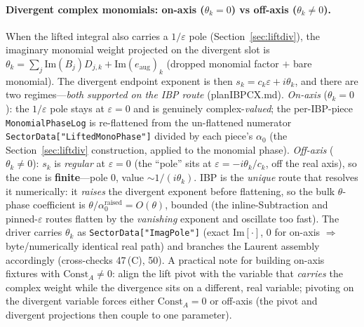 \documentclass[11pt,a4paper]{article}
\begin{document}
\paragraph{Divergent complex monomials: on-axis ($\theta_k=0$) vs off-axis ($\theta_k\neq 0$).} When the lifted integral also carries a $1/\varepsilon$ pole (Section~\ref{sec:liftdiv}), the imaginary monomial weight projected on the divergent slot is $\theta_k=\sum_j\mathrm{Im}(B_j)D_{j,k}+\mathrm{Im}(e_{\mathrm{aug}})_k$ (dropped monomial factor $+$ bare monomial). The divergent endpoint exponent is then $s_k=c_k\varepsilon+i\theta_k$, and there are two regimes---\emph{both supported on the IBP route} (planIBPCX.md). \emph{On-axis} ($\theta_k=0$): the $1/\varepsilon$ pole stays at $\varepsilon=0$ and is genuinely complex-\emph{valued}; the per-IBP-piece \texttt{MonomialPhaseLog} is re-flattened from the un-flattened numerator \texttt{SectorData["LiftedMonoPhase"]} divided by each piece's $\alpha_0$ (the Section~\ref{sec:liftdiv} construction, applied to the monomial phase). \emph{Off-axis} ($\theta_k\neq 0$): $s_k$ is \emph{regular} at $\varepsilon=0$ (the ``pole'' sits at $\varepsilon=-i\theta_k/c_k$, off the real axis), so the cone is \textbf{finite}---pole $0$, value $\sim 1/(i\theta_k)$. IBP is the \emph{unique} route that resolves it numerically: it \emph{raises} the divergent exponent before flattening, so the bulk $\theta$-phase coefficient is $\theta/\alpha_0^{\text{raised}}=O(\theta)$, bounded (the inline-Subtraction and pinned-$\varepsilon$ routes flatten by the \emph{vanishing} exponent and oscillate too fast). The driver carries $\theta_k$ as \texttt{SectorData["ImagPole"]} (exact $\mathrm{Im}[\cdot]$, $0$ for on-axis $\Rightarrow$ byte/numerically identical real path) and branches the Laurent assembly accordingly (cross-checks 47\,(C), 50). A practical note for building on-axis fixtures with $\mathrm{Const}_A\neq 0$: align the lift pivot with the variable that \emph{carries} the complex weight while the divergence sits on a different, real variable; pivoting on the divergent variable forces either $\mathrm{Const}_A=0$ or off-axis (the pivot and divergent projections then couple to one parameter).
\end{document}
